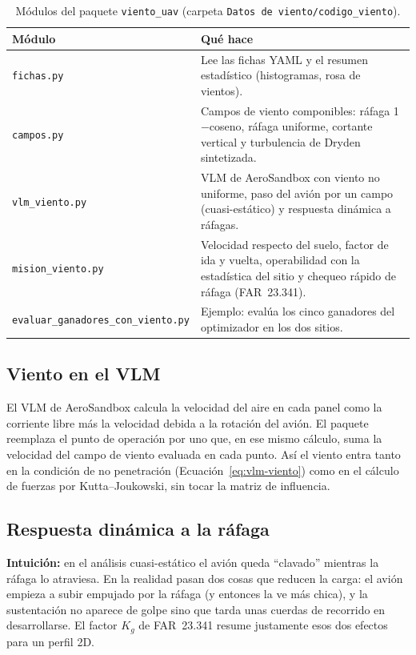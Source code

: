 \documentclass[11pt]{article}
\begin{document}
\begin{table}[H]
\centering
\small
\begin{tabular}{@{}p{3.4cm}p{10.4cm}@{}}
\toprule
Módulo & Qué hace \\
\midrule
\texttt{fichas.py} & Lee las fichas YAML y el resumen estadístico (histogramas, rosa de vientos). \\
\texttt{campos.py} & Campos de viento componibles: ráfaga 1$-$coseno, ráfaga uniforme, cortante vertical y turbulencia de Dryden sintetizada. \\
\texttt{vlm\_viento.py} & VLM de AeroSandbox con viento no uniforme, paso del avión por un campo (cuasi-estático) y respuesta dinámica a ráfagas. \\
\texttt{mision\_viento.py} & Velocidad respecto del suelo, factor de ida y vuelta, operabilidad con la estadística del sitio y chequeo rápido de ráfaga (FAR~23.341). \\
\texttt{evaluar\_ganadores\_}\newline\texttt{con\_viento.py} & Ejemplo: evalúa los cinco ganadores del optimizador en los dos sitios. \\
\bottomrule
\end{tabular}
\caption{Módulos del paquete \texttt{viento\_uav} (carpeta \texttt{Datos de viento/codigo\_viento}).}
\end{table}

\subsection{Viento en el VLM}

El VLM de AeroSandbox calcula la velocidad del aire en cada panel como la
corriente libre más la velocidad debida a la rotación del avión. El paquete
reemplaza el punto de operación por uno que, en ese mismo cálculo, suma la
velocidad del campo de viento evaluada en cada punto. Así el viento entra
tanto en la condición de no penetración (Ecuación~\ref{eq:vlm-viento}) como
en el cálculo de fuerzas por Kutta--Joukowski, sin tocar la matriz de
influencia.

\subsection{Respuesta dinámica a la ráfaga}

\textbf{Intuición:} en el análisis cuasi-estático el avión queda ``clavado''
mientras la ráfaga lo atraviesa. En la realidad pasan dos cosas que reducen
la carga: el avión empieza a subir empujado por la ráfaga (y entonces la ve
más chica), y la sustentación no aparece de golpe sino que tarda unas
cuerdas de recorrido en desarrollarse. El factor $K_g$ de FAR~23.341 resume
justamente esos dos efectos para un perfil 2D.
\end{document}
